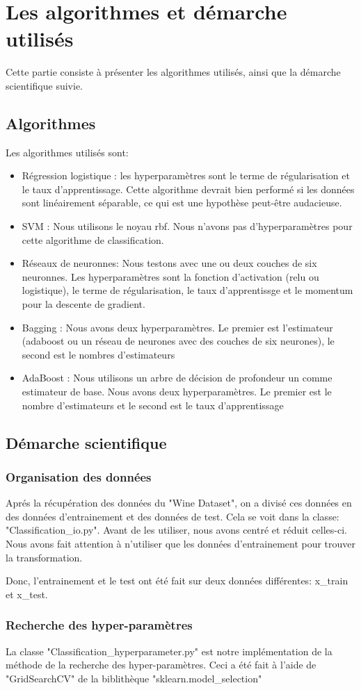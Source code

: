 \chapter{Les algorithmes et démarche utilisés}
\par Cette partie consiste à présenter les algorithmes utilisés, ainsi que la démarche scientifique suivie.
\section{Algorithmes}
Les algorithmes utilisés sont:
\begin{itemize}[label=\textbullet]
\item Régression logistique : les hyperparamètres sont le terme de régularisation et le taux d'apprentissage. Cette algorithme devrait bien performé si les données
    sont linéairement séparable, ce qui est une hypothèse peut-être audacieuse.
\item SVM : Nous utilisons le noyau rbf. Nous n'avons pas d'hyperparamètres pour cette algorithme de classification.
\item Réseaux de neuronnes: Nous testons avec une ou deux couches de six neuronnes. Les hyperparamètres sont la fonction d'activation (relu ou logistique), le terme
    de régularisation, le taux d'apprentissge et le momentum pour la descente de gradient.
\item Bagging : Nous avons deux hyperparamètres. Le premier est l'estimateur (adaboost ou un réseau de neurones avec des couches de six neurones), le second est le
    nombres d'estimateurs
\item AdaBoost : Nous utilisons un arbre de décision de profondeur un comme estimateur de base. Nous avons deux hyperparamètres. Le premier est le nombre
    d'estimateurs et le second est le taux d'apprentissage
\end{itemize}

\section{Démarche scientifique}
\subsection{Organisation des données}
\par Aprés la récupération des données du "Wine Dataset", on a divisé ces données en des données d'entrainement et des données de test. Cela se voit dans la classe: "Classification\_io.py". Avant de les utiliser, nous avons centré et réduit celles-ci. Nous avons fait attention à n'utiliser que les données d'entrainement pour trouver
la transformation.
\par Donc, l'entrainement et le test ont été fait sur deux données différentes: x\_train et x\_test.

\subsection{Recherche des hyper-paramètres}
\par La classe "Classification\_hyperparameter.py" est notre implémentation de la méthode de la recherche des hyper-paramètres. Ceci a été fait à l'aide de "GridSearchCV" de la biblithèque "sklearn.model\_selection"

